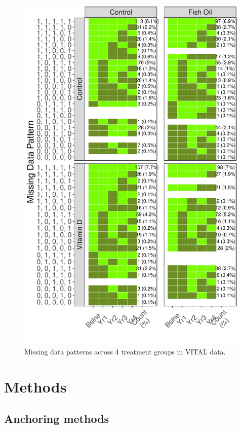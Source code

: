 \documentclass{article}
\newcommand{\pandocbounded}[1]{#1}
\begin{document}
\begin{figure}
\centering
\pandocbounded{\includegraphics[keepaspectratio]{Final_Report_files/figure-latex/unnamed-chunk-23-1.pdf}}
\caption{Missing data patterns across 4 treatment groups in VITAL data.}
\end{figure}

\newpage

\section{Methods}\label{methods}

\subsection{Anchoring methods}\label{anchoring-methods}
\end{document}
